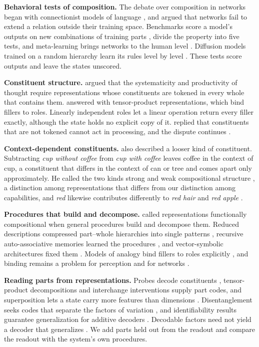 \textbf{Behavioral tests of composition.} The debate over composition in networks began with connectionist models of language \citep{rumelhart1986,pinker1988,elman1990}, and \citet{marcus1998} argued that networks fail to extend a relation outside their training space. Benchmarks score a model's outputs on new combinations of training parts \citep{lake2018,keysers2020}, \citet{hupkes2020} divide the property into five tests, and meta-learning brings networks to the human level \citep{lake2023}. Diffusion models trained on a random hierarchy learn its rules level by level \citep{favero2025diffusion}. These tests score outputs and leave the states unscored.

\textbf{Constituent structure.} \citet{fodor1988} argued that the systematicity and productivity of thought require representations whose constituents are tokened in every whole that contains them. \citet{smolensky1990} answered with tensor-product representations, which bind fillers to roles. Linearly independent roles let a linear operation return every filler exactly, although the state holds no explicit copy of it. \citet{fodor1990} replied that constituents that are not tokened cannot act in processing, and the dispute continues \citep{goodale2026}.

\textbf{Context-dependent constituents.} \citet{smolensky1988} also described a looser kind of constituent. Subtracting \emph{cup without coffee} from \emph{cup with coffee} leaves coffee in the context of cup, a constituent that differs in the context of can or tree and comes apart only approximately. He called the two kinds strong and weak compositional structure \citep{smolensky1987}, a distinction among representations that differs from our distinction among capabilities, and \emph{red} likewise contributes differently to \emph{red hair} and \emph{red apple} \citep{kamp1995}.

\textbf{Procedures that build and decompose.} \citet{vangelder1990} called representations functionally compositional when general procedures build and decompose them. Reduced descriptions compressed part--whole hierarchies into single patterns \citep{hinton1990}, recursive auto-associative memories learned the procedures \citep{pollack1990}, and vector-symbolic architectures fixed them \citep{plate1995,gayler2006,kanerva2009}. Models of analogy bind fillers to roles explicitly \citep{hummel1997}, and binding remains a problem for perception and for networks \citep{treisman1980,greff2020}.

\textbf{Reading parts from representations.} Probes decode constituents \citep{belinkov2022}, tensor-product decompositions \citep{mccoy2019} and interchange interventions \citep{geiger2021} supply part codes, and superposition lets a state carry more features than dimensions \citep{elhage2022}. Disentanglement seeks codes that separate the factors of variation \citep{bengio2013,locatello2019}, and identifiability results guarantee generalization for additive decoders \citep{lachapelle2023,wiedemer2024}. Decodable factors need not yield a decoder that generalizes \citep{montero2021}. We add parts held out from the readout and compare the readout with the system's own procedures.

